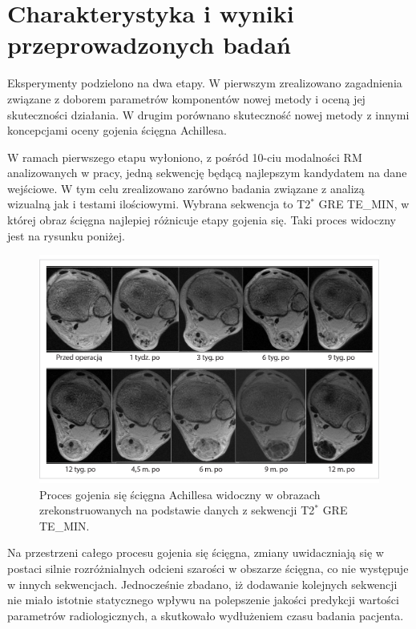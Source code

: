 {\let\clearpage\relax\chapter*{Charakterystyka i wyniki przeprowadzonych badań}}

Eksperymenty podzielono na dwa etapy. W pierwszym zrealizowano zagadnienia związane z doborem parametrów komponentów nowej metody i oceną jej skuteczności działania. W drugim porównano skuteczność nowej metody z innymi koncepcjami oceny gojenia ścięgna Achillesa. 

W ramach pierwszego etapu wyłoniono, z pośród 10-ciu modalności RM analizowanych w pracy, jedną sekwencję będącą najlepszym kandydatem na dane wejściowe. W tym celu zrealizowano zarówno badania związane z analizą wizualną jak i testami ilościowymi. Wybrana sekwencja to T2$^\ast$ GRE TE\_MIN, w której obraz ścięgna najlepiej różnicuje etapy gojenia się. Taki proces widoczny jest na rysunku poniżej.
\begin{figure}[h]
	\centering
	\includegraphics[width=1\textwidth]{figures/T2gremin.jpg}
	\caption{Proces gojenia się ścięgna Achillesa widoczny w obrazach zrekonstruowanych na podstawie danych z sekwencji T2$^\ast$ GRE TE\_MIN.}\label{fig:T2comp}
\end{figure}

Na przestrzeni całego procesu gojenia się ścięgna, zmiany uwidaczniają się w postaci silnie rozróżnialnych odcieni szarości w obszarze ścięgna, co nie występuje w innych sekwencjach.
Jednocześnie zbadano, iż dodawanie kolejnych sekwencji nie miało istotnie statycznego wpływu na polepszenie jakości predykcji wartości parametrów radiologicznych, a skutkowało wydłużeniem czasu badania pacjenta. 

